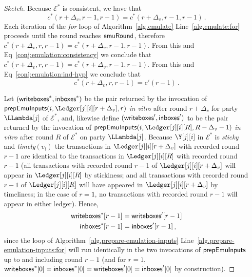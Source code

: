 \begin{proof}[Sketch]
  Because $\mathcal{E}^*$ is consistent, we have that
  \begin{equation}\label{conj:emulation:consistency}
    c^*(r + \Delta_v, r - 1, r - 1) = c^*(r + \Delta_v, r - 1, r - 1)\,.
  \end{equation}
  Each iteration of the \emph{for} loop of Algorithm~\ref{alg.emulate} Line~\ref{alg.emulate:for}
  proceeds until the round reaches $\textsf{emuRound}$, therefore
  $c^*(r + \Delta_v, r, r - 1) = c^*(r + \Delta_v, r - 1, r - 1)$.
  From this and Eq~\ref{conj:emulation:consistency} we conclude that
  $c^*(r + \Delta_v, r, r - 1) = c^*(r + \Delta_v, r - 1, r - 1)$.
  From this and Eq~\ref{conj:emulation:ind-hyp} we conclude that
  \begin{equation}\label{conj:emulation:pre-state}
    c^*(r + \Delta_v, r, r - 1) = c'(r - 1)\,.
  \end{equation}

  Let $(\textsf{writeboxes}^*, \textsf{inboxes}^*)$
  be the pair
  returned by the invocation of $\prepareEmulationInputs(i, \Ledger[j][i][r + \Delta_v], r)$
  \emph{in vitro} after round $r + \Delta_v$ for party $\LLambda[j]$ of $\mathcal{E}^*$, and, likewise define
  $(\textsf{writeboxes}', \textsf{inboxes}')$ to be the pair
  returned by the invocation of $\prepareEmulationInputs(i, \Ledger[j][i][R], R - \Delta_v - 1)$
  \emph{in vitro} after round $R$ of $\mathcal{E}^*$ on party $\LLambda[j]$.
  Because $\Y[j][i]$ in $\mathcal{E}^*$ is \emph{sticky} and \emph{timely}$(v_i)$
  the transactions in
  $\Ledger[j][i][r + \Delta_v]$ with recorded round $r - 1$ are identical to
  the transactions in $\Ledger[j][i][R]$ with recorded round $r - 1$
  (all transactions with recorded round $r - 1$ of $\Ledger[j][i][r + \Delta_v]$
   will appear in $\Ledger[j][i][R]$ by stickiness;
   and all transactions with recorded round $r - 1$ of $\Ledger[j][i][R]$ will
   have appeared in $\Ledger[j][i][r + \Delta_v]$ by timeliness; in the case of
   $r = 1$, no transactions with recorded round $r - 1$ will appear in either
   ledger).
  Hence,
  \begin{align}
    \textsf{writeboxes}^*[r - 1] &= \textsf{writeboxes}'[r - 1]\label{conj:emulation:eq-inputs-writes}\\
    \textsf{inboxes}^*[r - 1] &= \textsf{inboxes}'[r - 1]\label{conj:emulation:eq-inputs-inboxes}\,,
  \end{align}
  since the loop of Algorithm~\ref{alg.prepare-emulation-inputs} Line~\ref{alg.prepare-emulation-inputs:for}
  will run identically in the two invocations of $\textsf{prepEmuInputs}$ up to
  and including round $r - 1$ (and for
  $r = 1$, $\textsf{writeboxes}^*[0] = \textsf{inboxes}^*[0] = \textsf{writeboxes}'[0] = \textsf{inboxes}'[0]$ by construction).


\end{proof}
